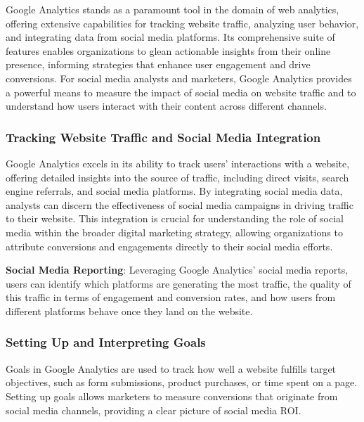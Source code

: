 \documentclass[
]{book}
\begin{document}
Google Analytics stands as a paramount tool in the domain of web analytics, offering extensive capabilities for tracking website traffic, analyzing user behavior, and integrating data from social media platforms. Its comprehensive suite of features enables organizations to glean actionable insights from their online presence, informing strategies that enhance user engagement and drive conversions. For social media analysts and marketers, Google Analytics provides a powerful means to measure the impact of social media on website traffic and to understand how users interact with their content across different channels.

\hypertarget{tracking-website-traffic-and-social-media-integration}{%
\subsubsection*{Tracking Website Traffic and Social Media Integration}\label{tracking-website-traffic-and-social-media-integration}}

Google Analytics excels in its ability to track users' interactions with a website, offering detailed insights into the source of traffic, including direct visits, search engine referrals, and social media platforms. By integrating social media data, analysts can discern the effectiveness of social media campaigns in driving traffic to their website. This integration is crucial for understanding the role of social media within the broader digital marketing strategy, allowing organizations to attribute conversions and engagements directly to their social media efforts.

\textbf{Social Media Reporting}: Leveraging Google Analytics' social media reports, users can identify which platforms are generating the most traffic, the quality of this traffic in terms of engagement and conversion rates, and how users from different platforms behave once they land on the website.

\hypertarget{setting-up-and-interpreting-goals}{%
\subsubsection*{Setting Up and Interpreting Goals}\label{setting-up-and-interpreting-goals}}

Goals in Google Analytics are used to track how well a website fulfills target objectives, such as form submissions, product purchases, or time spent on a page. Setting up goals allows marketers to measure conversions that originate from social media channels, providing a clear picture of social media ROI.
\end{document}
